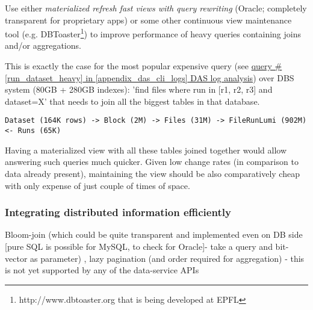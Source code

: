 Use either \textit{materialized refresh fast views with query rewriting} (Oracle; completely transparent for proprietary apps)\cite{Oracle11}
 or some other continuous view maintenance tool (e.g. DBToaster\footnote{http://www.dbtoaster.org that is being developed at EPFL}) to improve performance of heavy queries containing joins and/or aggregations.

This is exactly the case for the most popular expensive query (see \hyperref[run_dataset_heavy]{query \#\ref{run_dataset_heavy} in \ref{appendix_das_cli_logs} DAS log analysis}) over DBS system (80GB + 280GB indexes): 'find files where run in [r1, r2, r3] and dataset=X' that needs to join all the biggest tables in that database.

\begin{verbatim}
Dataset (164K rows) -> Block (2M) -> Files (31M) -> FileRunLumi (902M) <- Runs (65K)
\end{verbatim}

Having a materialized view with all these tables joined together would allow answering such queries much quicker. Given low change rates (in comparison to data already present), maintaining the view should be also comparatively cheap with only expense of just couple of times of space.



\subsubsection*{Integrating distributed information efficiently}
Bloom-join (which could be quite transparent and implemented even on DB side [pure SQL is possible for MySQL, to check for Oracle]- take a query and bit-vector as parameter) , lazy pagination (and order required for aggregation) - this is not yet supported by any of the data-service APIs


